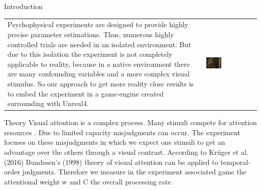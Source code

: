 \documentclass[a0paper,portrait]{baposter}
\begin{document}
\begin{poster}
{		}
		
		
		
		\begin{posterbox}[name=intro,span=2,column=0,row=0]{Introduction}
			\begin{tabular}{p{} p{}}
				Psychophysical experiments are designed to provide highly precise parameter estimations. Thus, numerous highly controlled trials are needed in an isolated environment. But due to this isolation the experiment is not completely applicable to reality, because in a native environment there are many confounding variables and a more complex visual stimulus.
				So our approach to get more reality close results is to embed the experiment in a game-engine created surrounding with Unreal4.
				& 
				\vspace{-8pt}
				\includegraphics[width=0.32\textwidth]{race2.png}\\
			\end{tabular}
			
		\end{posterbox}
		
		\begin{posterbox}[name=theory,column=0,row=1,below=intro]{Theory}
			Visual attention is a complex process. Many stimuli compete for attention resources . Due to limited capacity misjudgments can occur. The experiment focuses on these misjudgments in which we expect one stimuli to get an advantage over the others through a visual contrast. According to Krüger et al. (2016) Bundesen's (1998) theory of visual attention can be applied to temporal-order judgments. Therefore we measure in the experiment associated game the attentional weight w and C the overall processing rate. 
		\end{posterbox}
		

\end{poster}
\end{document}
